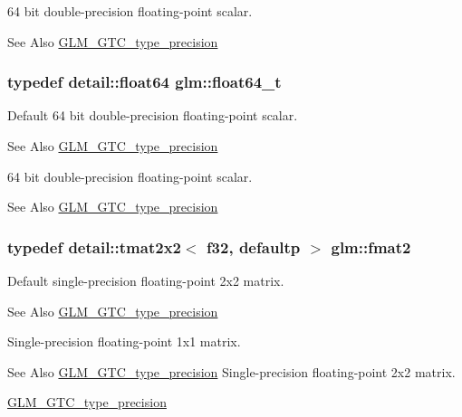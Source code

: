 64 bit double-\/precision floating-\/point scalar. \begin{DoxySeeAlso}{See Also}
\hyperlink{group__gtc__type__precision}{G\-L\-M\-\_\-\-G\-T\-C\-\_\-type\-\_\-precision} 
\end{DoxySeeAlso}
\hypertarget{group__gtc__type__precision_gade966a3eb25ebeb16dd53c40d3fdeb46}{
\subsubsection[{float64\-\_\-t}]{\setlength{\rightskip}{0pt plus 5cm}typedef detail\-::float64 {\bf glm\-::float64\-\_\-t}}}\label{group__gtc__type__precision_gade966a3eb25ebeb16dd53c40d3fdeb46}
Default 64 bit double-\/precision floating-\/point scalar. \begin{DoxySeeAlso}{See Also}
\hyperlink{group__gtc__type__precision}{G\-L\-M\-\_\-\-G\-T\-C\-\_\-type\-\_\-precision}
\end{DoxySeeAlso}
64 bit double-\/precision floating-\/point scalar. \begin{DoxySeeAlso}{See Also}
\hyperlink{group__gtc__type__precision}{G\-L\-M\-\_\-\-G\-T\-C\-\_\-type\-\_\-precision} 
\end{DoxySeeAlso}
\hypertarget{group__gtc__type__precision_ga96b15c5eaecce87b352dab5d373da979}{
\subsubsection[{fmat2}]{\setlength{\rightskip}{0pt plus 5cm}typedef detail\-::tmat2x2$<$ f32, defaultp $>$ {\bf glm\-::fmat2}}}\label{group__gtc__type__precision_ga96b15c5eaecce87b352dab5d373da979}
Default single-\/precision floating-\/point 2x2 matrix. \begin{DoxySeeAlso}{See Also}
\hyperlink{group__gtc__type__precision}{G\-L\-M\-\_\-\-G\-T\-C\-\_\-type\-\_\-precision}
\end{DoxySeeAlso}
Single-\/precision floating-\/point 1x1 matrix. \begin{DoxySeeAlso}{See Also}
\hyperlink{group__gtc__type__precision}{G\-L\-M\-\_\-\-G\-T\-C\-\_\-type\-\_\-precision} Single-\/precision floating-\/point 2x2 matrix. 

\hyperlink{group__gtc__type__precision}{G\-L\-M\-\_\-\-G\-T\-C\-\_\-type\-\_\-precision} 
\end{DoxySeeAlso}
